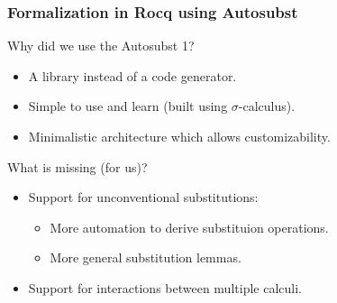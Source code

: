 \begin{frame}
  \frametitle{Formalization in Rocq using Autosubst}

  Why did we use the Autosubst 1?
  \begin{itemize}
  \item<2-> A library instead of a code generator.
  \item<3-> Simple to use and learn (built using $\sigma$-calculus).
  \item<4-> Minimalistic architecture which allows customizability.
  \end{itemize}
  
  What is missing (for us)?
  \begin{itemize}
  \item<5->Support for unconventional substitutions:
  \begin{itemize}
  \item<6-> More automation to derive substituion operations.
  \item<7-> More general substitution lemmas.
  \end{itemize}
  \item<8-> Support for interactions between multiple calculi.
  \end{itemize}
  
\end{frame}

